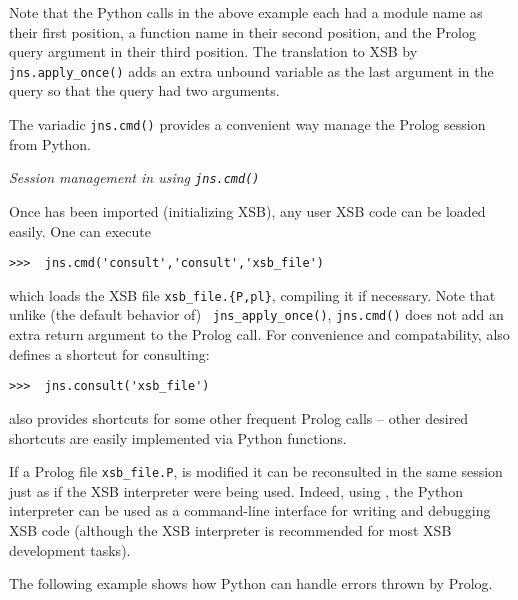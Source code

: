 Note that the Python calls in the above example each had a module name
as their first position, a function name in their second position, and
the Prolog query argument in their third position.  The translation to
XSB by {\tt jns.apply\_once()} adds an extra unbound variable as the
last argument in the query so that the query had two arguments.

The variadic {\tt jns.cmd()} provides a convenient way manage the
Prolog session from Python.  

\begin{example} \rm {\it Session management in \januspy{} using {\tt jns.cmd()}} \label{ex:jns-cmd}

  Once \januspy{} has been imported (initializing XSB), any user XSB
  code can be loaded easily.  One can execute
  
\begin{verbatim}
>>>  jns.cmd('consult','consult','xsb_file')
\end{verbatim}

\noindent
which loads the XSB file {\tt xsb\_file.\{P,pl\}}, compiling it if
necessary.  Note that unlike (the default behavior of) {\tt
  jns\_apply\_once()}, {\tt jns.cmd()} does not add an extra return
argument to the Prolog call.  For convenience and compatability,
\januspy{} also defines a shortcut for consulting:

\begin{verbatim}
>>>  jns.consult('xsb_file')
\end{verbatim}

\noindent
\januspy{} also provides shortcuts for some other frequent Prolog calls
-- other desired shortcuts are easily implemented via Python
functions.

If a Prolog file {\tt xsb\_file.P}, is modified it can be reconsulted
in the same session just as if the XSB interpreter were being used.
Indeed, using \januspy{}, the Python interpreter can be used as a
command-line interface for writing and debugging XSB code (although
the XSB interpreter is recommended for most XSB development tasks).
\end{example}

The following example shows how Python can handle errors thrown by
Prolog.

